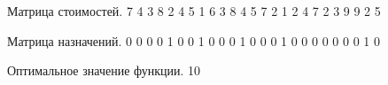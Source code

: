 Матрица стоимостей.
   7   4   3   8   2
   4   5   1   6   3
   8   4   5   7   2
   1   2   4   7   2
   3   9   9   2   5

Матрица назначений.
   0   0   0   0   1
   0   0   1   0   0
   0   1   0   0   0
   1   0   0   0   0
   0   0   0   1   0

Оптимальное значение функции.
10
